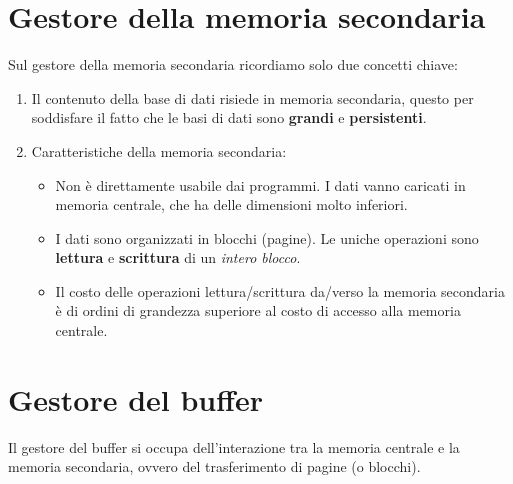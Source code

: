 \documentclass[11pt]{report}
\begin{document}
\begin{center}
\end{center}

\section{Gestore della memoria secondaria}

Sul gestore della memoria secondaria ricordiamo solo due concetti chiave:
\begin{enumerate}
\item Il contenuto della base di dati risiede in memoria secondaria, questo per soddisfare il fatto che le basi di dati sono \textbf{grandi} e \textbf{persistenti}.
\item Caratteristiche della memoria secondaria:
	\begin{itemize}
		\item Non \`e direttamente usabile dai programmi. I dati vanno caricati in memoria centrale, che ha delle dimensioni molto inferiori.
		\item I dati sono organizzati in blocchi (pagine). Le uniche operazioni sono \textbf{lettura} e \textbf{scrittura} di un \emph{intero blocco}.
		\item Il costo delle operazioni lettura/scrittura da/verso la memoria secondaria \`e di ordini di grandezza superiore al costo di accesso alla memoria centrale.
	\end{itemize}
\end{enumerate}

\section{Gestore del buffer}
Il gestore del buffer si occupa dell'interazione tra la memoria centrale e la memoria secondaria, ovvero del trasferimento di pagine (o blocchi).
\end{document}

